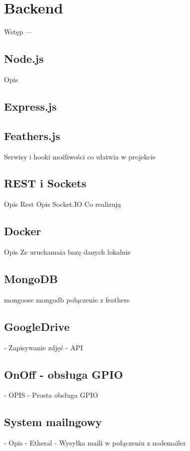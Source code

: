 \chapter{Backend}
\label{ch:funplenop}

Wstęp ---

\section{Node.js}
Opis

\section*{Express.js}

\section{Feathers.js}
Serwisy i hooki
możliwości
co ułatwia w projekcie

\section{REST i Sockets}
Opis Rest
Opis Socket.IO
Co realizują

\section{Docker}
Opis
Ze uruchamaia bazę danych lokalnie

\section{MongoDB}
    mongoose
    mongodb
    połączenie z feathers

\section{GoogleDrive}
- Zapisywanie zdjęć
- API

\section{OnOff - obsługa GPIO}
- OPIS
- Prosta obsługa GPIO

\section{System mailngowy}
- Opis
- Etheral
- Wysyłka maili w połączeniu z nodemailer